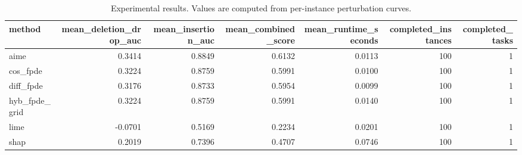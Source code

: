 \begin{table}[t]
\caption{Experimental results. Values are computed from per-instance perturbation curves.}
\label{tab:main_results_computed}
\centering
\begin{tabular}{lrrrrrr}
\toprule
method & mean\_deletion\_drop\_auc & mean\_insertion\_auc & mean\_combined\_score & mean\_runtime\_seconds & completed\_instances & completed\_tasks \\
\midrule
aime & 0.3414 & 0.8849 & 0.6132 & 0.0113 & 100 & 1 \\
cos\_fpde & 0.3224 & 0.8759 & 0.5991 & 0.0100 & 100 & 1 \\
diff\_fpde & 0.3176 & 0.8733 & 0.5954 & 0.0099 & 100 & 1 \\
hyb\_fpde\_grid & 0.3224 & 0.8759 & 0.5991 & 0.0140 & 100 & 1 \\
lime & -0.0701 & 0.5169 & 0.2234 & 0.0201 & 100 & 1 \\
shap & 0.2019 & 0.7396 & 0.4707 & 0.0746 & 100 & 1 \\
\bottomrule
\end{tabular}

\end{table}
